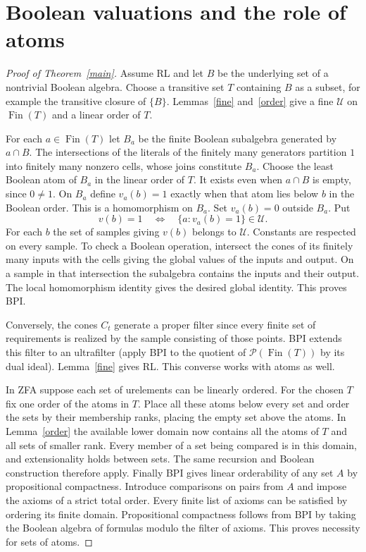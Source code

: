 \documentclass[11pt]{article}
\newcommand{\Fin}{\operatorname{Fin}}
\newcommand{\UU}{\mathcal U}
\begin{document}
\section{Boolean valuations and the role of atoms}
\begin{proof}[Proof of Theorem~\ref{main}]
Assume RL and let $B$ be the underlying set of a nontrivial Boolean algebra. Choose a transitive set $T$ containing $B$ as a subset, for example the transitive closure of $\{B\}$. Lemmas~\ref{fine} and~\ref{order} give a fine $\UU$ on $\Fin(T)$ and a linear order of $T$.

For each $a\in\Fin(T)$ let $B_a$ be the finite Boolean subalgebra generated by $a\cap B$. The intersections of the literals of the finitely many generators partition $1$ into finitely many nonzero cells, whose joins constitute $B_a$. Choose the least Boolean atom of $B_a$ in the linear order of $T$. It exists even when $a\cap B$ is empty, since $0\ne1$. On $B_a$ define $v_a(b)=1$ exactly when that atom lies below $b$ in the Boolean order. This is a homomorphism on $B_a$. Set $v_a(b)=0$ outside $B_a$. Put
\[
 v(b)=1 \quad\Longleftrightarrow\quad \{a:v_a(b)=1\}\in\UU.
\]
For each $b$ the set of samples giving $v(b)$ belongs to $\UU$. Constants are respected on every sample. To check a Boolean operation, intersect the cones of its finitely many inputs with the cells giving the global values of the inputs and output. On a sample in that intersection the subalgebra contains the inputs and their output. The local homomorphism identity gives the desired global identity. This proves BPI.

Conversely, the cones $C_t$ generate a proper filter since every finite set of requirements is realized by the sample consisting of those points. BPI extends this filter to an ultrafilter (apply BPI to the quotient of $\mathcal P(\Fin(T))$ by its dual ideal). Lemma~\ref{fine} gives RL. This converse works with atoms as well.

In ZFA suppose each set of urelements can be linearly ordered. For the chosen $T$ fix one order of the atoms in $T$. Place all these atoms below every set and order the sets by their membership ranks, placing the empty set above the atoms. In Lemma~\ref{order} the available lower domain now contains all the atoms of $T$ and all sets of smaller rank. Every member of a set being compared is in this domain, and extensionality holds between sets. The same recursion and Boolean construction therefore apply. Finally BPI gives linear orderability of any set $A$ by propositional compactness. Introduce comparisons on pairs from $A$ and impose the axioms of a strict total order. Every finite list of axioms can be satisfied by ordering its finite domain. Propositional compactness follows from BPI by taking the Boolean algebra of formulas modulo the filter of axioms. This proves necessity for sets of atoms.
\end{proof}
\end{document}
